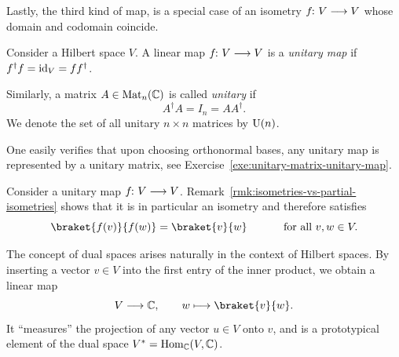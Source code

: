 \documentclass[a4paper, oneside, 12pt]{amsart}
\begin{document}
Lastly, the third kind of map, is a special case of an isometry \(f\from V\to V\)  whose domain and codomain coincide.

\begin{definition}\label{def:unitary-matrix}
  Consider a Hilbert space \(V\).
  A linear map \(f \from V \to V\) is a \emph{unitary map} if \(f^{\dagger} f = \mathrm{id}_{V} = f f^{\dagger}\).


  Similarly, a matrix \( A \in \operatorname{Mat}_n(\mathbb{C}) \) is called \emph{unitary} if
  \begin{equation}
    A^\dagger A = I_n = A A^\dagger.
  \end{equation}
  We denote the set of all unitary \( n \times n \) matrices by \( \operatorname{U}(n) \).
\end{definition}
One easily verifies that upon choosing orthonormal bases, any unitary map is represented by a unitary matrix, see Exercise~\ref{exe:unitary-matrix-unitary-map}.

\begin{remark}\label{rmk:unitaries-are-isometrics}
  Consider a unitary map \(f \from V\to V\). Remark~\ref{rmk:isometries-vs-partial-isometries} shows that it is in particular an isometry and therefore satisfies
  \begin{equation*}
    \braket{f(v)}{f(w)} = \braket{v}{w} \qquad\quad \text{ for all } v,w \in V.
  \end{equation*}
\end{remark}

The concept of dual spaces arises naturally in the context of Hilbert spaces.
By inserting a vector \( v \in V \) into the first entry of the inner product, we obtain a linear map
\begin{equation*}
    V \to \mathbb{C}, \qquad w \mapsto \braket{v}{w} .
\end{equation*}
It ``measures'' the projection of any vector \( u \in V \) onto \( v \), and is a prototypical element of the dual space \( \rd*{V}= \Hom_{ \mathbb{C}}(V, \mathbb{C})\).
\end{document}
